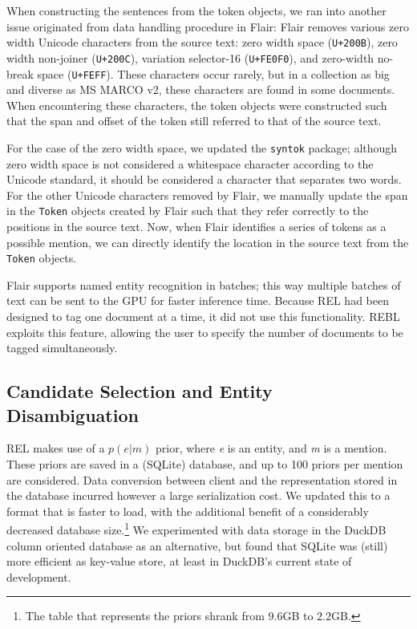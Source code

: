 When constructing the sentences from the token objects, we ran into another issue originated from data handling procedure in Flair: Flair removes various zero width Unicode characters from the source text: zero width space (\texttt{U+200B}), zero width non-joiner (\texttt{U+200C}), variation selector-16 (\texttt{U+FE0F0}), and zero-width no-break space (\texttt{U+FEFF}). These characters occur rarely, but in a collection as big and diverse as MS MARCO v2, these characters are found in some documents. When encountering these characters, the token objects were constructed such that the span and offset of the token still referred to that of the source text.

For the case of the zero width space, we updated the \texttt{syntok} package; although zero width space is not considered a whitespace character according to the Unicode standard, it should be considered a character that separates two words. For the other Unicode characters removed by Flair, we manually update the span in the \texttt{Token} objects created by Flair such that they refer correctly to the positions in the source text. Now, when Flair identifies a series of tokens as a possible mention, we can directly identify the location in the source text from the \texttt{Token} objects.

Flair supports named entity recognition in batches; this way multiple batches of text can be sent to the GPU for faster inference time. Because REL had been designed to tag one document at a time, it did not use this functionality. REBL exploits this feature, allowing the user to specify the number of documents to be tagged simultaneously.

\subsection{Candidate Selection and Entity Disambiguation}
REL makes use of a $p(e|m)$ prior, where \textit{e} is an entity, and \textit{m} is a mention. These priors are saved in a (SQLite) database, and up to 100 priors per mention are considered. Data conversion between client and the representation stored in the database incurred however a large serialization cost. We updated this to a format that is faster to load, with the additional benefit of a considerably decreased database size.\footnote{The table that represents the priors shrank from $9.6$GB to $2.2$GB.}
We experimented with data storage in the DuckDB column oriented database as an alternative, but found that SQLite was (still) more efficient as key-value store, at least in DuckDB's current state of development.

